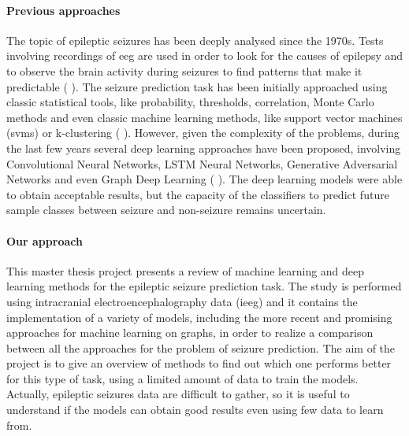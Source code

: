\paragraph{Previous approaches} The topic of epileptic seizures has been deeply analysed since the 1970s. Tests involving recordings of \acs{eeg} are used in order to look for the causes of epilepsy and to observe the brain activity during seizures to find patterns that make it predictable (\cite{LancetNeurol:Seizurelikelihood} \cite{CurrOpinNeurol:Preseizure}). The seizure prediction task has been initially approached using classic statistical tools, like probability, thresholds, correlation, Monte Carlo methods and even classic machine learning methods, like support vector machines (\acsp{svm}) or k-clustering (\cite{Brain:Longroad} \cite{JClinNeurophysiol:stateoftheart} \cite{IEEE:nonlineareeg} \cite{ClinicalNeurophysiology:chance} \cite{NeuroscienceMethod:therapeuticdevices} \cite{arXiv:VLSIBCISystem} \cite{ComputMathMethodsMed:mlmethods}). However, given the complexity of the problems, during the last few years several deep learning approaches have been proposed, involving Convolutional Neural Networks, LSTM Neural Networks, Generative Adversarial Networks and even Graph Deep Learning (\cite{CurrOpinNeurol:review} \cite{arXiv:earlyseizuredetection} \cite{IEEE:graphtheory} \cite{NeuralNetworks:cnn} \cite{arXiv:quantitativeanalysis} \cite{arXiv:gan}). The deep learning models were able to obtain acceptable results, but the capacity of the classifiers to predict future sample classes between seizure and non-seizure remains uncertain.

\paragraph{Our approach} This master thesis project presents a review of machine learning and deep learning methods for the epileptic seizure prediction task. The study is performed using intracranial electroencephalography data (\acs{ieeg}) and it contains the implementation of a variety of models, including the more recent and promising approaches for machine learning on graphs, in order to realize a comparison between all the approaches for the problem of seizure prediction. The aim of the project is to give an overview of methods to find out which one performs better for this type of task, using a limited amount of data to train the models. Actually, epileptic seizures data are difficult to gather, so it is useful to understand if the models can obtain good results even using few data to learn from.

